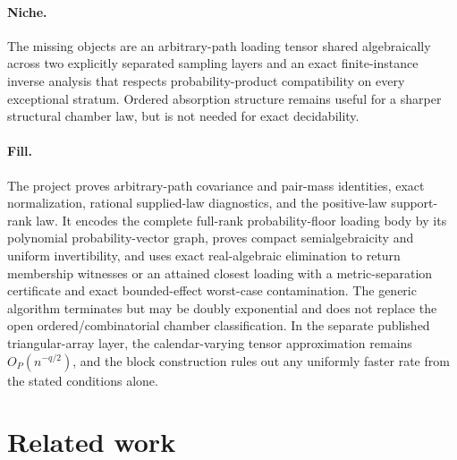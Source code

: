 \documentclass{article}
\begin{document}
\paragraph{Niche.} The missing objects are an arbitrary-path loading tensor shared algebraically across two explicitly separated sampling layers and an exact finite-instance inverse analysis that respects probability-product compatibility on every exceptional stratum. Ordered absorption structure remains useful for a sharper structural chamber law, but is not needed for exact decidability.

\paragraph{Fill.} The project proves arbitrary-path covariance and pair-mass identities, exact normalization, rational supplied-law diagnostics, and the positive-law support-rank law. It encodes the complete full-rank probability-floor loading body by its polynomial probability-vector graph, proves compact semialgebraicity and uniform invertibility, and uses exact real-algebraic elimination to return membership witnesses or an attained closest loading with a metric-separation certificate and exact bounded-effect worst-case contamination. The generic algorithm terminates but may be doubly exponential and does not replace the open ordered/combinatorial chamber classification. In the separate published triangular-array layer, the calendar-varying tensor approximation remains \(O_P(n^{-q/2})\), and the block construction rules out any uniformly faster rate from the stated conditions alone.

\section{Related work}
\end{document}
